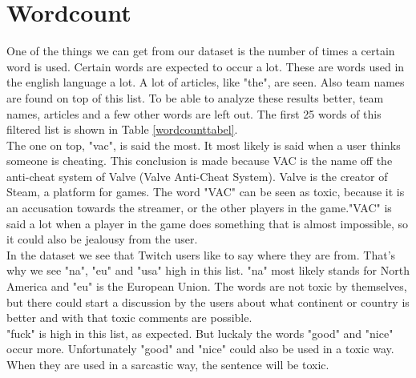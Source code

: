 \documentclass[final]{report}
\begin{document}
\noindent
\begin{minipage}{.5\textwidth}
  
\section{Wordcount}
One of the things we can get from our dataset is the number of times a certain word is used.
Certain words are expected to occur a lot. These are words used in the english language a lot. A lot of articles, like "the", are seen. Also team names are found on top of this list. To be able to analyze these results better, team names, articles and a few other words are left out. The first 25 words of this filtered list is shown in Table \ref{wordcounttabel}.\\
The one on top, "vac", is said the most. It most likely is said when a user thinks someone is cheating. This conclusion is made because VAC is the name off the anti-cheat system of Valve (Valve Anti-Cheat System). Valve is the creator of Steam, a platform for games. The word "VAC" can be seen as toxic, because it is an accusation towards the streamer, or the other players in the game."VAC" is said a lot when a player in the game does something that is almost impossible, so it could also be jealousy from the user.\\
In the dataset we see that Twitch users like to say where they are from. That's why we see "na", "eu" and "usa" high in this list. "na" most likely stands for North America and "eu" is the European Union. The words are not toxic by themselves, but there could start a discussion by the users about what continent or country is better and with that toxic comments are possible.\\
"fuck" is high in this list, as expected. But luckaly the words "good" and "nice" occur more. Unfortunately "good" and "nice" could also be used in a toxic way. When they are used in a sarcastic way, the sentence will be toxic. 

\end{minipage}%
\end{document}
